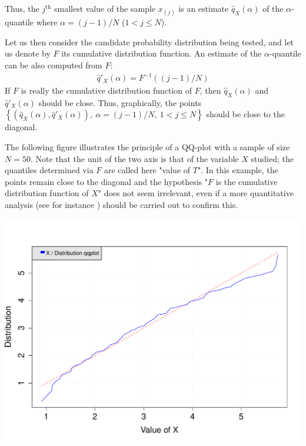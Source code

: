 {  Thus, the $j^\textrm{th}$ smallest value of the sample $x_{(j)}$ is an estimate $\widehat{q}_{X}(\alpha)$ of the $\alpha$-quantile where $\alpha = (j-1)/N$ ($1 < j \leq N$).

  Let us then consider the candidate probability distribution being tested, and let us denote by $F$ its cumulative distribution function. An estimate of the $\alpha$-quantile can be also computed from $F$:
  \begin{align*}
    \widehat{q}'_{X}(\alpha) = F^{-1} \left( (j-1)/N \right)
  \end{align*}
  If $F$ is really the cumulative distribution function of $F$, then $\widehat{q}_{X}(\alpha)$ and $\widehat{q}'_{X}(\alpha)$ should be close. Thus, graphically, the points $\left\{ \left( \widehat{q}_{X}(\alpha),\widehat{q}'_{X}(\alpha)\right),\  \alpha = (j-1)/N,\ 1 < j \leq N \right\}$ should be close to the diagonal.

  The following figure illustrates the principle of a QQ-plot with a sample of size $N=50$. Note that the unit of the two axis is that of the variable $X$ studied; the quantiles determined via $F$ are called here "value of $T$". In this example, the points remain close to the diagonal and the hypothesis "$F$ is the cumulative distribution function of $X$" does not seem irrelevant, even if a more quantitative analysis (see for instance ) should be carried out to confirm this.

  \begin{center}
    \includegraphics[scale=0.5]{Figures/QQplotDistribOk.pdf}
  \end{center}

}
